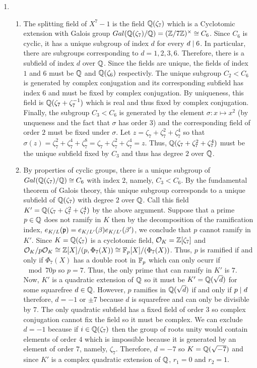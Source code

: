 \documentclass[12pt]{extarticle}
\begin{document}
 
\begin{enumerate}
\item
\begin{enumerate}
\item The splitting field of $X^7 - 1$ is the field $\mathbb{Q}(\zeta_7)$ which is a Cyclotomic extension with Galois group $Gal \small(\mathbb{Q}(\zeta_7)/\mathbb{Q} \small) = (\mathbb{Z} / 7\mathbb{Z})^\times \cong C_6$. Since $C_6$ is cyclic, it has a unique subgroup of index $d$ for every $d \mid 6$. In particular, there are subgroups corresponding to $d = 1, 2, 3, 6$. Therefore, there is a subfield of index $d$ over $\mathbb{Q}$. Since the fields are unique, the fields of index $1$ and $6$ must be $\mathbb{Q}$ and $\mathbb{Q}(\zeta_6)$ respectivly. The unique subgroup $C_2 < C_6$ is generated by complex conjugation and its corresponding subfield has index $6$ and must be fixed by complex conjugation. By uniqueness, this field is $\mathbb{Q}(\zeta_7 + \zeta_7^{-1})$ which is real and thus fixed by complex conjugation. Finally, the subgroup $C_3 < C_6$ is generated by the element $\sigma : x \mapsto x^2$ (by unqueness and the fact that $\sigma$ has order 3) and the corresponding field of order $2$ must be fixed under $\sigma$. Let $z = \zeta_7 + \zeta_7^2 + \zeta_7^4$ so that $\sigma(z) = \zeta_7^2 + \zeta_7^4 + \zeta_7^8 = \zeta_7 + \zeta_7^2 + \zeta_7^4 = z$. Thus, $\mathbb{Q}(\zeta_7 + \zeta_7^2 + \zeta_7^4)$ must be the unique subfield fixed by $C_3$ and thus has degree $2$ over $\mathbb{Q}$.   

\item By properties of cyclic groups, there is a unique subgroup of $Gal \small(\mathbb{Q}(\zeta_7)/\mathbb{Q} \small) \cong C_6$ with index $2$, namely, $C_3 < C_6$. By the fundamental theorem of Galois theory, this unique subgroup corresponds to a unique subfield of $\mathbb{Q}(\zeta_7)$ with degree $2$ over $\mathbb{Q}$. Call this field $K' = \mathbb{Q}(\zeta_7 + \zeta_7^2 + \zeta_7^4)$ by the above argument. Suppose that a prime $p \in \mathbb{Q}$ does not ramify in $K$ then by the decomposition of the ramification index, $e_{K/L}(\mathfrak{p}) = e_{K/L'}(\beta) e_{K/L'}(\beta')$, we conclude that $p$ cannot ramify in $K'$. Since $K = \mathbb{Q}(\zeta_7)$ is a cyclotomic field, $\mathcal{O}_{K} = \mathbb{Z}[\zeta_7]$ and $\mathcal{O}_{K}/p \mathcal{O}_{K} \cong \mathbb{Z}[X]/(p, \Phi_7(X)) \cong \mathbb{F}_{p}[X]/(\Phi_7(X))$. Thus, $p$ is ramified if and only if $\Phi_7(X)$ has a double root in $\mathbb{F}_{p}$ which can only ocurr if $\mod{7}{0}{p}$ so $p = 7$. Thus, the only prime that can ramify in $K'$ is $7$. Now, $K'$ is a quadratic extension of $\mathbb{Q}$ so it must be $K' = \mathbb{Q} \small(\sqrt{d} \small)$ for some squarefree $d \in \mathbb{Q}$. However, $p$ ramifies in $\mathbb{Q} \small(\sqrt{d} \small)$ if and only if $p \mid d$ therefore, $d = - 1$ or $\pm 7$ because $d$ is squarefree and can only be divisible by $7$. The only quadratic subfield has a fixed field of order $3$ so complex conjugation cannot fix the field so it must be complex. We can exclude $d = -1$ because if $i \in \mathbb{Q}(\zeta_7)$ then the group of roots unity would contain elements of order $4$ which is impossible because it is generated by an element of order $7$, namely, $\zeta_7$. Therefore, $d = -7$ so $K = \mathbb{Q} \small(\sqrt{-7} \small)$ and since $K'$ is a complex quadratic extension of $\mathbb{Q}$, $r_1 = 0$ and $r_2 = 1$.  


\end{enumerate}
\end{enumerate}
\end{document}

